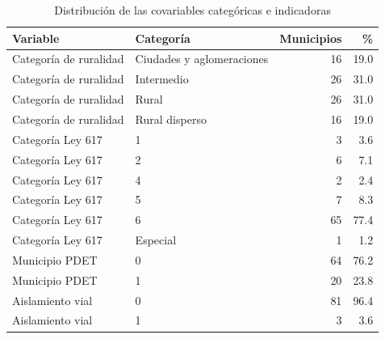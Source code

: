 \begin{table}

\caption{\label{tab:descriptivo-cuali}Distribución de las covariables categóricas e indicadoras}
\centering
\begin{tabular}[t]{llrr}
\toprule
Variable & Categoría & Municipios & \%\\
\midrule
Categoría de ruralidad & Ciudades y aglomeraciones & 16 & 19.0\\
Categoría de ruralidad & Intermedio & 26 & 31.0\\
Categoría de ruralidad & Rural & 26 & 31.0\\
Categoría de ruralidad & Rural disperso & 16 & 19.0\\
Categoría Ley 617 & 1 & 3 & 3.6\\
\addlinespace
Categoría Ley 617 & 2 & 6 & 7.1\\
Categoría Ley 617 & 4 & 2 & 2.4\\
Categoría Ley 617 & 5 & 7 & 8.3\\
Categoría Ley 617 & 6 & 65 & 77.4\\
Categoría Ley 617 & Especial & 1 & 1.2\\
\addlinespace
Municipio PDET & 0 & 64 & 76.2\\
Municipio PDET & 1 & 20 & 23.8\\
Aislamiento vial & 0 & 81 & 96.4\\
Aislamiento vial & 1 & 3 & 3.6\\
\bottomrule
\end{tabular}
\end{table}
